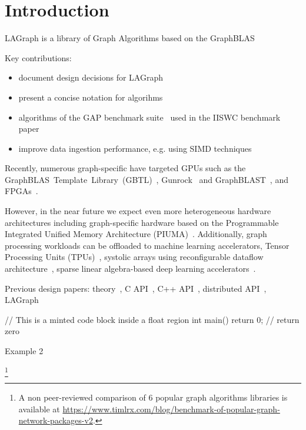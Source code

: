 \section{Introduction}
\label{sec:introduction}

LAGraph is a library of Graph Algorithms based on the GraphBLAS

Key contributions:

\begin{itemize}
    \item document design decisions for LAGraph
    \item present a concise notation for \grb algorihms
    \item algorithms of the GAP benchmark suite~\cite{DBLP:journals/corr/BeamerAP15} used in the IISWC benchmark paper~\cite{DBLP:conf/iiswc/AzadABBCDDDDFGG20}
    \item improve data ingestion performance, e.g. using SIMD techniques~\cite{DBLP:journals/vldb/LangdaleL19}
\end{itemize}

Recently, numerous graph-specific have targeted GPUs such as the \mbox{GraphBLAS Template Library (GBTL)}~\cite{7529957}, Gunrock~\cite{DBLP:journals/topc/WangPDWYWOYLRO17} and \mbox{GraphBLAST}~\cite{DBLP:journals/corr/abs-1908-01407}, and FPGAs~\cite{DBLP:journals/corr/abs-1903-06697}.

However, in the near future we expect even more heterogeneous hardware architectures including graph-specific hardware based on the Programmable Integrated Unified Memory Architecture (PIUMA)~\cite{DBLP:journals/corr/abs-2010-06277}.
Additionally, graph processing workloads can be offloaded to  machine learning accelerators, \eg
Tensor Processing Units (TPUs)~\cite{DBLP:conf/isca/JouppiYPPABBBBB17},
systolic arrays using reconfigurable dataflow architecture~\cite{SambaNova},
sparse linear algebra-based deep learning accelerators~\cite{Cerebras}.

Previous \grb design papers:
theory~\cite{DBLP:conf/hpec/MattsonBBBDFFGGHKLLPPRSWY13},
C API~\cite{DBLP:conf/hpec/MattsonYMBM17},
C++ API~\cite{DBLP:conf/ipps/BrockBMMM20},
distributed API~\cite{DBLP:conf/ipps/BrockBMMMPSS20},
LAGraph~\cite{DBLP:conf/ipps/MattsonDKBMMY19}

\begin{listing}[h]
\begin{cplus}
// This is a minted code block inside a float region
int main() {
    return 0; // return zero
}
\end{cplus}
\caption{Example 2}
\end{listing}


\footnote{A non peer-reviewed comparison of 6 popular graph algorithms libraries is available at
\url{https://www.timlrx.com/blog/benchmark-of-popular-graph-network-packages-v2}.}
